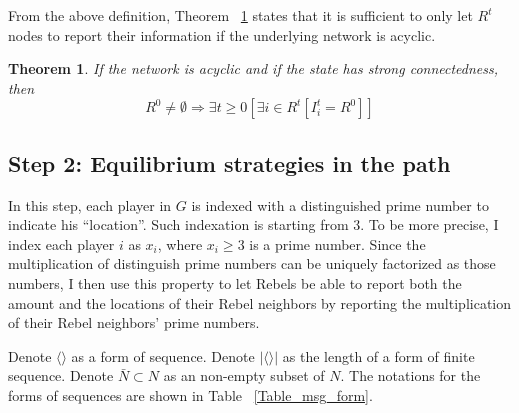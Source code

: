 \documentclass[12pt,letter]{article}
\newtheorem{theorem}{Theorem}
\theoremstyle{definition}
\theoremstyle{remark}
\theoremstyle{claim}
\begin{document}
From the above definition, Theorem ~\ref{lemma_empty} states that it is sufficient to only let $R^t$ nodes to report their information if the underlying network is acyclic. 
\begin{theorem}
\label{lemma_empty}
If the network is acyclic and if the state has strong connectedness, then 
\[R^0\neq \emptyset \Rightarrow \exists t\geq 0[\exists i\in R^t[I^t_i=R^0]]\]
\end{theorem}



\subsection{Step 2: Equilibrium strategies in the path}


In this step, each player in $G$ is indexed with a distinguished prime number to indicate his ``location''. Such indexation is starting from $3$. To be more precise, I index each player $i$ as $x_i$, where $x_i\geq 3$ is a prime number. Since the multiplication of distinguish prime numbers can be uniquely factorized as those numbers, I then use this property to let Rebels be able to report both the amount and the locations of their Rebel neighbors by reporting the multiplication of their Rebel neighbors' prime numbers.

Denote $\langle\rangle$ as a form of sequence. Denote $|\langle\rangle|$ as the length of a form of finite sequence. Denote $\bar{N}\subset N$ as an non-empty subset of $N$. The notations for the forms of sequences are shown in Table ~\ref{Table_msg_form}. 
\end{document}
